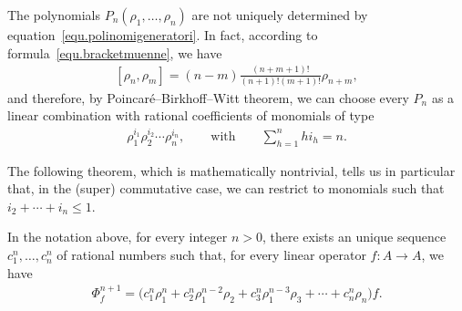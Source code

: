 The polynomials $P_n(\rho_1,\ldots,\rho_n)$ are not uniquely determined by equation~\eqref{equ.polinomigeneratori}. In fact, according to formula~\eqref{equ.bracketmuenne}, we have
\begin{gather}\label{equ.bracketrhoenne}
[\rho_n,\rho_m]=(n-m)\frac{(n+m+1)!}{(n+1)!(m+1)!}\rho_{n+m},\end{gather}
and therefore, by Poincar\'e--Birkhof\/f--Witt theorem, we can choose every $P_n$ as a linear combination with rational coef\/f\/icients of monomials of type
\begin{gather*} \rho_1^{i_1}\rho_2^{i_2}\cdots \rho_n^{i_n},\qquad \text{with}\qquad\sum_{h=1}^n hi_h=n .\end{gather*}

The following theorem, which is mathematically nontrivial, tells us in particular that, in the (super) commutative case, we can restrict to monomials such that $i_2+\cdots+i_n\le 1$.

\begin{Theorem}\label{thm.standardform}
In the notation above, for every integer $n>0$, there exists an unique sequence
$c_1^n,\ldots,c_n^n$ of rational numbers
such that, for every linear operator $f\colon A\to A$, we have
\begin{gather*}\Phi^{n+1}_f=\big(c_1^n\rho_1^n+c^n_2\rho_1^{n-2}\rho_2+c^n_3\rho_1^{n-3}\rho_3+\cdots+c^n_n\rho_n\big)f.\end{gather*}
\end{Theorem}
